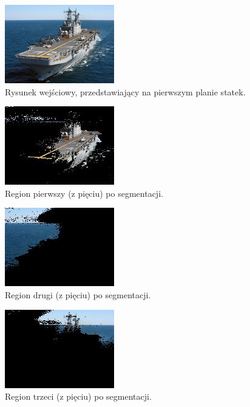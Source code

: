 \documentclass[10pt]{llncs}
\begin{document}
\FloatBarrier

\begin{figure}[h!]
  \centering
  \includegraphics[scale=33.0, clip]{img/ship.jpg}
	\caption[]
  {Rysunek wejściowy, przedstawiający na pierwszym planie statek.}
\end{figure}

\FloatBarrier

\begin{figure}[h!]
  \centering
  \includegraphics[scale=.8, clip]{img/ship_k5_0.jpg}
	\caption[]
  {Region pierwszy (z pięciu) po segmentacji.}
\end{figure}

\FloatBarrier

\begin{figure}[h!]
  \centering
  \includegraphics[scale=.8, clip]{img/ship_k5_1.jpg}
	\caption[]
  {Region drugi (z pięciu) po segmentacji.}
\end{figure}

\FloatBarrier

\begin{figure}[h!]
  \centering
  \includegraphics[scale=.8, clip]{img/ship_k5_2.jpg}
	\caption[]
  {Region trzeci (z pięciu) po segmentacji.}
\end{figure}
\end{document}

